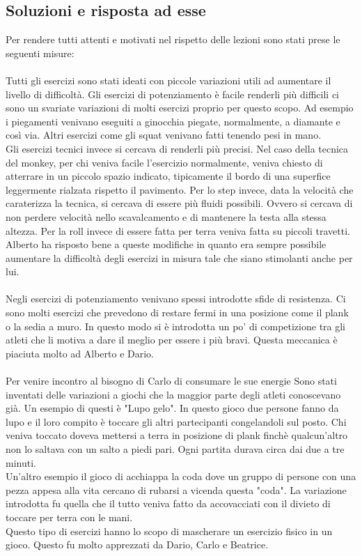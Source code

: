 \subsection{Soluzioni e risposta ad esse}

Per rendere tutti attenti e motivati nel rispetto delle lezioni sono stati prese le seguenti misure: \\
\\
Tutti gli esercizi sono stati ideati con piccole variazioni utili ad aumentare il livello di difficoltà. Gli esercizi di potenziamento è facile renderli più difficili ci sono un svariate variazioni di molti esercizi proprio per questo scopo. Ad esempio i piegamenti venivano eseguiti a ginocchia piegate, normalmente, a diamante e così via. Altri esercizi come gli squat venivano fatti tenendo pesi in mano. \\
Gli esercizi tecnici invece si cercava di renderli più precisi. Nel caso della tecnica del monkey, per chi veniva facile l'esercizio normalmente, veniva chiesto di atterrare in un piccolo spazio indicato, tipicamente il bordo di una superfice leggermente rialzata rispetto il pavimento. Per lo step invece, data la velocità che caraterizza la tecnica, si cercava di essere più fluidi possibili. Ovvero si cercava di non perdere velocità nello scavalcamento e di mantenere la testa alla stessa altezza. Per la roll invece di essere fatta per terra veniva fatta su piccoli travetti.\\
Alberto ha risposto bene a queste modifiche in quanto era sempre possibile aumentare la difficoltà degli esercizi in misura tale che siano stimolanti anche per lui.\\
\\
Negli esercizi di potenziamento venivano spessi introdotte sfide di resistenza. Ci sono molti esercizi che prevedono di restare fermi in una posizione come il plank o la sedia a muro. In questo modo si è introdotta un po' di competizione tra gli atleti che li motiva a dare il meglio per essere i più bravi. Questa meccanica è piaciuta molto ad Alberto e Dario.\\
\\
Per venire incontro al bisogno di Carlo di consumare le sue energie Sono stati inventati delle variazioni a giochi che la maggior parte degli atleti conoscevano già. Un esempio di questi è "Lupo gelo". In questo gioco due persone fanno da lupo e il loro compito è toccare gli altri partecipanti congelandoli sul posto. Chi veniva toccato doveva mettersi a terra in posizione di plank finchè qualcun'altro non lo saltava con un salto a piedi pari. Ogni partita durava circa dai due a tre minuti. \\
Un'altro esempio il gioco di acchiappa la coda dove un gruppo di persone con una pezza appesa alla vita cercano di rubarsi a vicenda questa "coda". La variazione introdotta fu quella che il tutto veniva fatto da accovacciati con il divieto di toccare per terra con le mani.\\
Questo tipo di esercizi hanno lo scopo di mascherare un esercizio fisico in un gioco. Questo fu molto apprezzati da Dario, Carlo e Beatrice.\\

